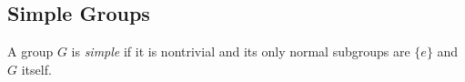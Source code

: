 \subsection{Simple Groups}\label{simplegroups}
A group $G$ is \emph{simple} if it is nontrivial and its only normal subgroups are $\{ e \}$ and $G$ itself.